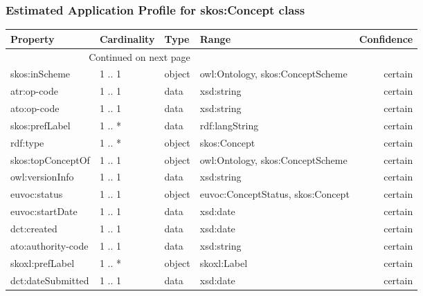 \documentclass[10pt,a4paper,titlepage,final]{article}
\begin{document}
\subsubsection{Estimated Application Profile for skos:Concept class}
\begin{tabularx}{\textwidth}{lllXr}
\toprule
               Property & Cardinality &    Type &                                              Range & Confidence \\
\midrule
\endhead
\midrule
\multicolumn{3}{r}{{Continued on next page}} \\
\midrule
\endfoot

\bottomrule
\endlastfoot
          skos:inScheme &      1 .. 1 &  object &                   owl:Ontology, skos:ConceptScheme &    certain \\
            atr:op-code &      1 .. 1 &    data &                                         xsd:string &    certain \\
            ato:op-code &      1 .. 1 &    data &                                         xsd:string &    certain \\
         skos:prefLabel &      1 .. * &    data &                                     rdf:langString &    certain \\
               rdf:type &      1 .. * &  object &                                       skos:Concept &    certain \\
      skos:topConceptOf &      1 .. 1 &  object &                   owl:Ontology, skos:ConceptScheme &    certain \\
        owl:versionInfo &      1 .. 1 &    data &                                         xsd:string &    certain \\
           euvoc:status &      1 .. 1 &  object &                  euvoc:ConceptStatus, skos:Concept &    certain \\
        euvoc:startDate &      1 .. 1 &    data &                                           xsd:date &    certain \\
            dct:created &      1 .. 1 &    data &                                           xsd:date &    certain \\
     ato:authority-code &      1 .. 1 &    data &                                         xsd:string &    certain \\
        skoxl:prefLabel &      1 .. * &  object &                                        skoxl:Label &    certain \\
      dct:dateSubmitted &      1 .. 1 &    data &                                           xsd:date &    certain \\

\end{tabularx}
\end{document}
